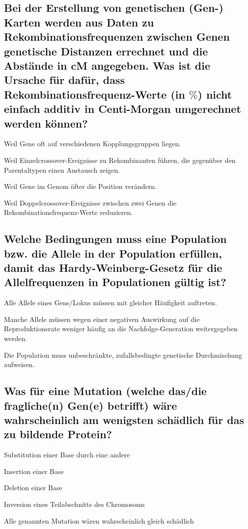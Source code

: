 \documentclass{article}
\begin{document}
\subsection*{Bei der Erstellung von genetischen (Gen-) Karten werden aus Daten zu
Rekombinationsfrequenzen zwischen Genen genetische Distanzen
errechnet und die Abstände in cM angegeben. Was ist die Ursache für
dafür, dass Rekombinationsfrequenz-Werte (in $\%$) nicht einfach additiv in
Centi-Morgan umgerechnet werden können?}
\begin{todolist}%
\item Weil Gene oft auf verschiedenen Kopplungsgruppen liegen.  
\item Weil Einzelcrossover-Ereignisse zu Rekombinanten führen, die
gegenüber den Parentaltypen einen Austausch zeigen.  
\item Weil Gene im Genom öfter die Position verändern.  
\item Weil Doppelcrossover-Ereignisse zwischen zwei Genen die
Rekombinationsfrequenz-Werte reduzieren.  
\end{todolist}

\subsection*{Welche Bedingungen muss eine Population bzw. die Allele in der
Population erfüllen, damit das Hardy-Weinberg-Gesetz für die
Allelfrequenzen in Populationen gültig ist?}
\begin{todolist}%
\item Alle Allele eines Gens/Lokus müssen mit gleicher Häufigkeit auftreten.  
\item Manche Allele müssen wegen einer negativen Auswirkung auf die
Reproduktionsrate weniger häufig an die Nachfolge-Generation
weitergegeben werden.  
\item Die Population muss unbeschränkte, zufallsbedingte genetische
Durchmischung aufweisen.  
\end{todolist}

\subsection*{Was für eine Mutation (welche das/die fragliche(n) Gen(e) betrifft) wäre
wahrscheinlich am wenigsten schädlich für das zu bildende Protein?}
\begin{todolist}%
\item Substitution einer Base durch eine andere   
\item Insertion einer Base  
\item Deletion einer Base  
\item Inversion eines Teilabschnitts des Chromosoms  
\item Alle genannten Mutation wären wahrscheinlich gleich schädlich  
\end{todolist}
\end{document}
